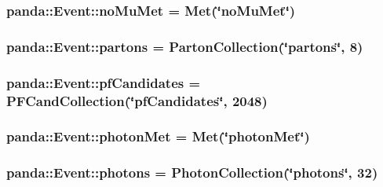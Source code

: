 \label{classpanda_1_1Event_aef6c4ad7a43f8bba87e0ed0c9cf38fbe}
\hypertarget{classpanda_1_1Event_a6b92c63f4fe3a3b7025884f3693c415f}{
\subsubsection[{noMuMet}]{ {\bf panda::Event::noMuMet} = {\bf Met}(\char`\"{}noMuMet\char`\"{})}}
\label{classpanda_1_1Event_a6b92c63f4fe3a3b7025884f3693c415f}
\hypertarget{classpanda_1_1Event_a55b3657dc273e8cec935272856474440}{
\subsubsection[{partons}]{ {\bf panda::Event::partons} = {\bf PartonCollection}(\char`\"{}partons\char`\"{}, 8)}}
\label{classpanda_1_1Event_a55b3657dc273e8cec935272856474440}
\hypertarget{classpanda_1_1Event_a04384fcc6ea7375bdd7282f60030ae64}{
\subsubsection[{pfCandidates}]{ {\bf panda::Event::pfCandidates} = {\bf PFCandCollection}(\char`\"{}pfCandidates\char`\"{}, 2048)}}
\label{classpanda_1_1Event_a04384fcc6ea7375bdd7282f60030ae64}
\hypertarget{classpanda_1_1Event_ad7826ab4d968d82a8390ef07b6a3f63d}{
\subsubsection[{photonMet}]{ {\bf panda::Event::photonMet} = {\bf Met}(\char`\"{}photonMet\char`\"{})}}
\label{classpanda_1_1Event_ad7826ab4d968d82a8390ef07b6a3f63d}
\hypertarget{classpanda_1_1Event_a42e6ea0ac65285f9d35d47db092765c5}{
\subsubsection[{photons}]{ {\bf panda::Event::photons} = {\bf PhotonCollection}(\char`\"{}photons\char`\"{}, 32)}}
